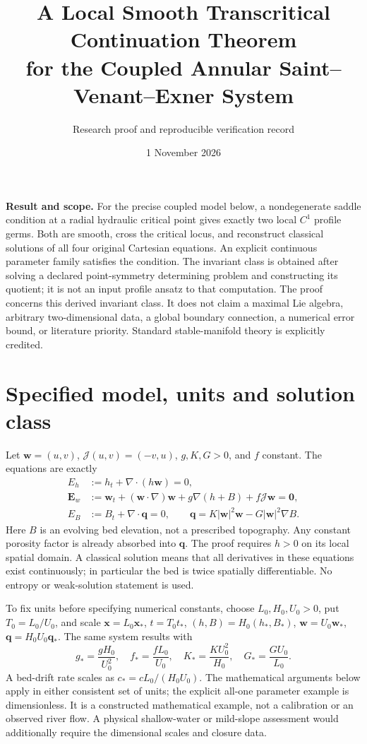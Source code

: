 \documentclass[11pt]{article}
\title{A Local Smooth Transcritical Continuation Theorem\\
for the Coupled Annular Saint--Venant--Exner System}
\author{Research proof and reproducible verification record}
\date{1 November 2026}
\theoremstyle{remark}\newtheorem{remark}[theorem]{Remark}
\begin{document}
\maketitle

\noindent\textbf{Result and scope.}
For the precise coupled model below, a nondegenerate saddle condition at a
radial hydraulic critical point gives exactly two local $C^1$ profile germs.
Both are smooth, cross the critical locus, and reconstruct classical solutions
of all four original Cartesian equations. An explicit continuous parameter
family satisfies the condition. The invariant class is obtained after solving
a declared point-symmetry determining problem and constructing its quotient;
it is not an input profile ansatz to that computation. The proof concerns this
derived invariant class. It does not claim a maximal Lie algebra, arbitrary
two-dimensional data, a global boundary connection, a numerical error bound,
or literature priority. Standard stable-manifold theory is explicitly credited.

\section{Specified model, units and solution class}
Let $\mathbf w=(u,v)$, $\mathcal J(u,v)=(-v,u)$, $g,K,G>0$, and $f$ constant.
The equations are exactly
\begin{align}
E_h&:=h_t+\nabla\cdot(h\mathbf w)=0,\label{eq:mass}\\
\mathbf E_w&:=\mathbf w_t+(\mathbf w\cdot\nabla)\mathbf w
 +g\nabla(h+B)+f\mathcal J\mathbf w=\mathbf0,\label{eq:mom}\\
E_B&:=B_t+\nabla\cdot\mathbf q=0,\qquad
\mathbf q=K|\mathbf w|^2\mathbf w-G|\mathbf w|^2\nabla B.\label{eq:bed}
\end{align}
Here $B$ is an evolving bed elevation, not a prescribed topography. Any constant
porosity factor is already absorbed into $\mathbf q$. The proof requires
$h>0$ on its local spatial domain. A classical solution means that all
derivatives in these equations exist continuously; in particular the bed is
twice spatially differentiable. No entropy or weak-solution statement is used.

To fix units before specifying numerical constants, choose $L_0,H_0,U_0>0$,
put $T_0=L_0/U_0$, and scale $\mathbf x=L_0\mathbf x_*$,
$t=T_0t_*$, $(h,B)=H_0(h_*,B_*)$, $\mathbf w=U_0\mathbf w_*$,
$\mathbf q=H_0U_0\mathbf q_*$. The same system results with
\[
g_*=\frac{gH_0}{U_0^2},\quad f_*=\frac{fL_0}{U_0},\quad
K_*=\frac{KU_0^2}{H_0},\quad G_*=\frac{GU_0}{L_0}.
\]
A bed-drift rate scales as $c_*=cL_0/(H_0U_0)$. The mathematical arguments
below apply in either consistent set of units; the explicit all-one parameter
example is dimensionless. It is a constructed mathematical example, not a
calibration or an observed river flow. A physical shallow-water or mild-slope
assessment would additionally require the dimensional scales and closure data.
\end{document}
